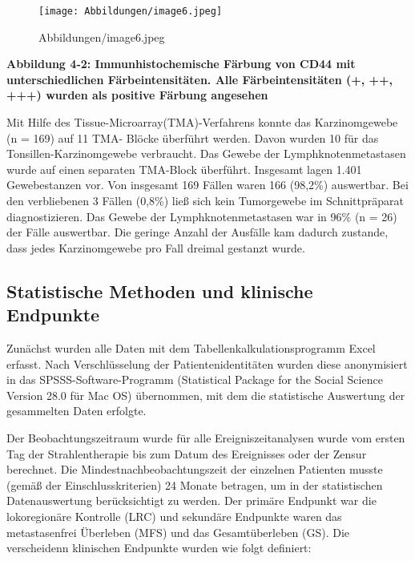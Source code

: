 \begin{fignos:no-prefix-figure-caption}

\begin{figure}
\centering
\texttt{[image: Abbildungen/image6.jpeg]}
\caption{Abbildungen/image6.jpeg}
\end{figure}

\end{fignos:no-prefix-figure-caption}

\textbf{Abbildung 4‑2: Immunhistochemische Färbung von CD44 mit unterschiedlichen Färbeintensitäten. Alle Färbeintensitäten (+, ++, +++) wurden als positive Färbung angesehen}

Mit Hilfe des Tissue-Microarray(TMA)-Verfahrens konnte das Karzinomgewebe (n = 169) auf 11 TMA- Blöcke überführt werden. Davon wurden 10 für das Tonsillen-Karzinomgewebe verbraucht. Das Gewebe der Lymphknotenmetastasen wurde auf einen separaten TMA-Block überführt. Insgesamt lagen 1.401 Gewebestanzen vor. Von insgesamt 169 Fällen waren 166 (98,2\%) auswertbar. Bei den verbliebenen 3 Fällen (0,8\%) ließ sich kein Tumorgewebe im Schnittpräparat diagnostizieren. Das Gewebe der Lymphknotenmetastasen war in 96\% (n = 26) der Fälle auswertbar. Die geringe Anzahl der Ausfälle kam dadurch zustande, dass jedes Karzinomgewebe pro Fall dreimal gestanzt wurde.

\hypertarget{statistische-methoden-und-klinische-endpunkte}{%
\subsection{Statistische Methoden und klinische Endpunkte}\label{statistische-methoden-und-klinische-endpunkte}}

Zunächst wurden alle Daten mit dem Tabellenkalkulationsprogramm Excel erfasst. Nach Verschlüsselung der Patientenidentitäten wurden diese anonymisiert in das SPSSS-Software-Programm (Statistical Package for the Social Science Version 28.0 für Mac OS) übernommen, mit dem die statistische Auswertung der gesammelten Daten erfolgte.

Der Beobachtungszeitraum wurde für alle Ereigniszeitanalysen wurde vom ersten Tag der Strahlentherapie bis zum Datum des Ereignisses oder der Zensur berechnet. Die Mindestnachbeobachtungszeit der einzelnen Patienten musste (gemäß der Einschlusskriterien) 24 Monate betragen, um in der statistischen Datenauswertung berücksichtigt zu werden. Der primäre Endpunkt war die lokoregionäre Kontrolle (LRC) und sekundäre Endpunkte waren das metastasenfrei Überleben (MFS) und das Gesamtüberleben (GS). Die verscheidenn klinischen Endpunkte wurden wie folgt definiert:

